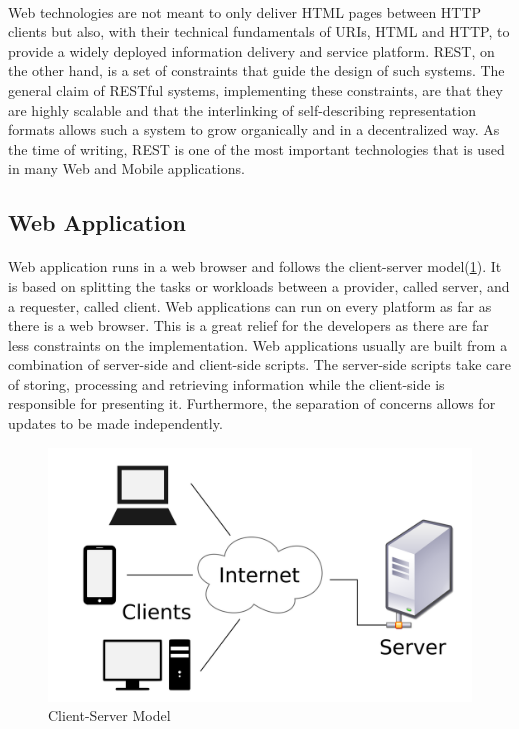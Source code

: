\documentclass{l4proj}
\begin{document}
\paragraph{}
Web technologies are not meant to only deliver HTML pages between HTTP clients but also, with their technical fundamentals of URIs, HTML and HTTP, to provide a widely deployed information delivery and service platform. REST, on the other hand, is a set of constraints that guide the design of such systems. The general claim of RESTful systems, implementing these constraints, are that they are highly scalable and that the interlinking of self-describing representation formats allows such a system to grow organically and in a decentralized way\cite{restful}. As the time of writing, REST is one of the most important technologies that is used in many Web and Mobile applications.

\subsection{Web Application}
\paragraph{}
Web application runs in a web browser and follows the client-server model(\ref{fig:clientserver}). It is based on splitting the tasks or workloads between a provider, called server, and a requester, called client. Web applications can run on every platform as far as there is a web browser. This is a great relief for the developers as there are far less constraints on the implementation. Web applications usually are built from a combination of  server-side and client-side scripts. The server-side scripts take care of storing, processing and retrieving information while the client-side is responsible for presenting it. Furthermore, the separation of concerns allows for updates to be made independently.    

\begin{figure}[H]
	\centering
	\includegraphics[width=.5\textwidth]{images/clientserver}
	\caption{Client-Server Model}
	\label{fig:clientserver}
\end{figure} 
\end{document}
